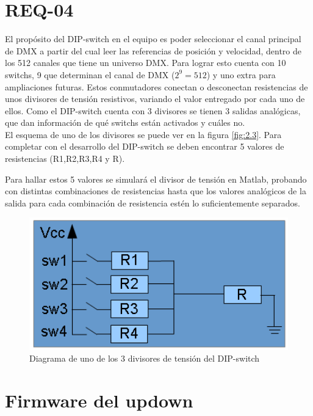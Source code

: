 \section{REQ-04} \label{sec:\thesection}
El propósito del DIP-switch en el equipo es poder seleccionar el canal principal de DMX a partir del cual leer las referencias de posición y velocidad, dentro de los 512 canales que tiene un universo DMX. Para lograr esto cuenta con 10 switchs, 9 que determinan el canal de DMX (\( 2^9 = 512 \)) y uno extra para ampliaciones futuras. Estos conmutadores conectan o desconectan resistencias de unos divisores de tensión resistivos, variando el valor entregado por cada uno de ellos. Como el DIP-switch cuenta con 3 divisores se tienen 3 salidas analógicas, que dan información de qué switchs están activados y cuáles no. \\
El esquema de uno de los divisores se puede ver en la figura \ref{fig:2.3}. Para completar con el desarrollo del DIP-switch se deben encontrar 5 valores de resistencias (R1,R2,R3,R4 y R).

Para hallar estos 5 valores se simulará el divisor de tensión en Matlab, probando con distintas combinaciones de resistencias hasta que los valores analógicos de la salida para cada combinación de resistencia estén lo suficientemente separados.

\begin{figure}[!ht]
	\centering
	\includegraphics[width=12cm,scale=1]{resources/2_3-dipswitch.png}
	\caption{Diagrama de uno de los 3 divisores de tensión del DIP-switch}
	\label{fig:\thefigure}
\end{figure}

\newpage
\section{Firmware del updown} \label{sec:\thesection}
